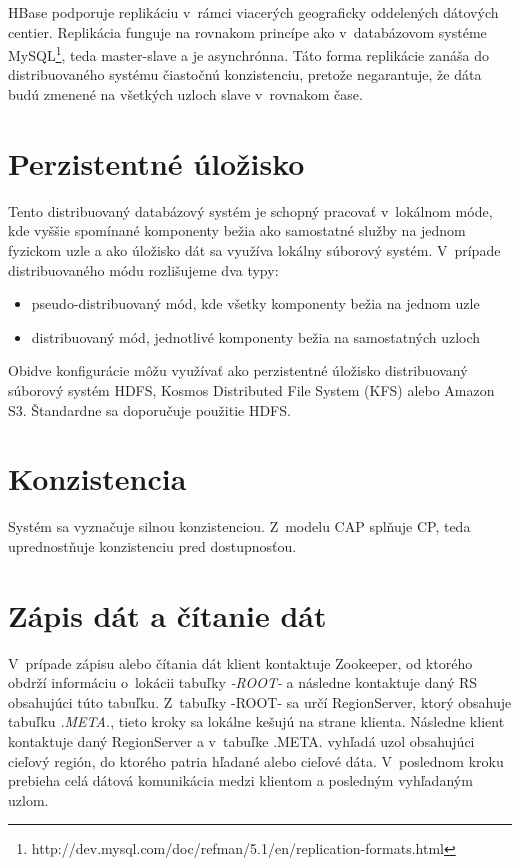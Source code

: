 \documentclass[11pt,twoside,a4paper]{book}
\begin{document}
HBase podporuje replikáciu v~rámci viacerých geograficky oddelených dátových centier. Replikácia funguje na rovnakom princípe ako v~databázovom systéme MySQL\footnote{http://dev.mysql.com/doc/refman/5.1/en/replication-formats.html}, teda master-slave a je asynchrónna. Táto forma replikácie zanáša do distribuovaného systému čiastočnú konzistenciu, pretože negarantuje, že dáta budú zmenené na všetkých uzloch slave v~rovnakom čase.




\section{Perzistentné úložisko}

Tento distribuovaný databázový systém je schopný pracovať v~lokálnom móde, kde vyššie spomínané komponenty bežia ako samostatné služby na jednom fyzickom uzle a ako úložisko dát sa využíva lokálny súborový systém. V~prípade distribuovaného módu rozlišujeme dva typy:
\begin{itemize}
 \item pseudo-distribuovaný mód, kde všetky komponenty bežia na jednom uzle
 \item distribuovaný mód, jednotlivé komponenty bežia na samostatných uzloch
\end{itemize}

Obidve konfigurácie môžu využívať ako perzistentné úložisko distribuovaný súborový systém HDFS, Kosmos Distributed File System (KFS) alebo Amazon S3. Štandardne sa doporučuje použitie HDFS.

\section{Konzistencia}

Systém sa vyznačuje silnou konzistenciou. Z~modelu CAP splňuje CP, teda uprednostňuje konzistenciu pred dostupnosťou.


\section{Zápis dát a čítanie dát}


V~prípade zápisu alebo čítania dát klient kontaktuje Zookeeper, od ktorého obdrží informáciu o~lokácii tabuľky \emph{-ROOT-} a následne kontaktuje daný RS obsahujúci túto tabuľku. Z~tabuľky -ROOT- sa určí RegionServer, ktorý obsahuje tabuľku \emph{.META.}, tieto kroky sa lokálne kešujú na strane klienta. Následne klient kontaktuje daný RegionServer a v~tabuľke .META. vyhľadá uzol obsahujúci cieľový región, do ktorého patria hľadané alebo cieľové dáta. V~poslednom kroku prebieha celá dátová komunikácia medzi klientom a posledným vyhľadaným uzlom.
\end{document}
